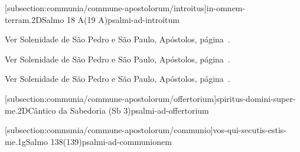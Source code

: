 \def\Prefix{subsection:communia/commune-apostolorum}

[\Prefix/introitus]{in-omnem-terram.2D}{Salmo 18 A(19 A)}{psalmi-ad-introitum}

\begin{rubrica}
  Ver Solenidade de São Pedro e São Paulo, Apóstolos, página~\pageref{subsection:proprium-sanctorum/sanctorum-petri-et-pauli-apostolorum/psalmus-responsorius}.
\end{rubrica}
\vspace{-2mm}

\begin{rubrica}
  Ver Solenidade de São Pedro e São Paulo, Apóstolos, página~\pageref{subsection:proprium-sanctorum/sanctorum-petri-et-pauli-apostolorum/alleluia}.
\end{rubrica}
\vspace{-2mm}

\begin{rubrica}
  Ver Solenidade de São Pedro e São Paulo, Apóstolos, página~\pageref{subsection:proprium-sanctorum/sanctorum-petri-et-pauli-apostolorum/psalmus-alleluiaticus}.
\end{rubrica}
\vspace{-2mm}

\AllowPageFlush

[\Prefix/offertorium]{spiritus-domini-super-me.2D}{Cântico da Sabedoria (Sb 3)}{psalmi-ad-offertorium}

\AllowPageBreak

[\Prefix/communio]{vos-qui-secutis-estis-me.1g}{Salmo 138(139)}{psalmi-ad-communionem}